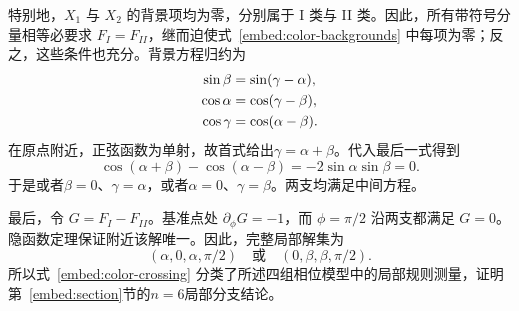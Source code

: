 特别地，$X_1$ 与 $X_2$ 的背景项均为零，分别属于 I 类与 II 类。因此，所有带符号分量相等必要求 $F_I=F_{II}$，继而迫使式~\eqref{embed:color-backgrounds} 中每项为零；反之，这些条件也充分。背景方程归约为
\begin{align}
 \sin\beta&=\sin(\gamma-\alpha),\notag\\
 \cos\alpha&=\cos(\gamma-\beta),\notag\\
 \cos\gamma&=\cos(\alpha-\beta).
 \label{embed:color-equations}
\end{align}
在原点附近，正弦函数为单射，故首式给出$\gamma=\alpha+\beta$。代入最后一式得到
\[
 \cos(\alpha+\beta)-\cos(\alpha-\beta)
 =-2\sin\alpha\sin\beta=0.
\]
于是或者$\beta=0$、$\gamma=\alpha$，或者$\alpha=0$、$\gamma=\beta$。两支均满足中间方程。

最后，令 $G=F_I-F_{II}$。基准点处 $\partial_\phi G=-1$，而 $\phi=\pi/2$ 沿两支都满足 $G=0$。隐函数定理保证附近该解唯一。因此，完整局部解集为
\begin{equation}
 (\alpha,0,\alpha,\pi/2)\quad\text{或}\quad(0,\beta,\beta,\pi/2).
 \label{embed:color-crossing}
\end{equation}
所以式~\eqref{embed:color-crossing} 分类了所述四组相位模型中的局部规则测量，证明第~\ref{embed:section}节的$n=6$局部分支结论。
